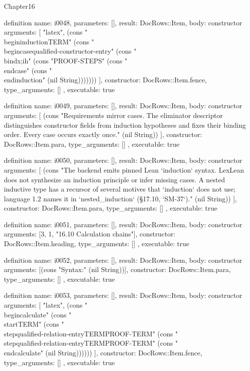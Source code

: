 \begin{lexlean}{Chapter16}
\begin{semanticmodule}
definition{
  name: i0048,
  parameters: [],
  result: DocRows::Item,
  body: constructor{
    arguments: [
      "latex",
      (cons "\\begin{induction}{TERM}" (cons "\\begin{case}{qualified-constructor-entry}" (cons "\\bind{x;ih}" (cons "PROOF-STEPS" (cons "\\end{case}" (cons "\\end{induction}" (nil String)))))))
    ],
    constructor: DocRows::Item.fence,
    type_arguments: []
  },
  executable: true
}

definition{
  name: i0049,
  parameters: [],
  result: DocRows::Item,
  body: constructor{
    arguments: [
      (cons "Requirements mirror cases. The eliminator descriptor distinguishes constructor fields from induction hypotheses and fixes their binding order. Every case occurs exactly once." (nil String))
    ],
    constructor: DocRows::Item.para,
    type_arguments: []
  },
  executable: true
}

definition{
  name: i0050,
  parameters: [],
  result: DocRows::Item,
  body: constructor{
    arguments: [
      (cons "The backend emits pinned Lean `induction` syntax. LexLean does not synthesize an induction principle or infer missing cases. A nested inductive type has a recursor of several motives that `induction` does not use; language 1.2 names it in `nested_induction` (§17.10, `SM-37`)." (nil String))
    ],
    constructor: DocRows::Item.para,
    type_arguments: []
  },
  executable: true
}

definition{
  name: i0051,
  parameters: [],
  result: DocRows::Item,
  body: constructor{
    arguments: [3, 1, "16.10 Calculation chains"],
    constructor: DocRows::Item.heading,
    type_arguments: []
  },
  executable: true
}

definition{
  name: i0052,
  parameters: [],
  result: DocRows::Item,
  body: constructor{
    arguments: [(cons "Syntax:" (nil String))],
    constructor: DocRows::Item.para,
    type_arguments: []
  },
  executable: true
}

definition{
  name: i0053,
  parameters: [],
  result: DocRows::Item,
  body: constructor{
    arguments: [
      "latex",
      (cons "\\begin{calculate}" (cons "\\start{TERM}" (cons "\\step{qualified-relation-entry}{TERM}{PROOF-TERM}" (cons "\\step{qualified-relation-entry}{TERM}{PROOF-TERM}" (cons "\\end{calculate}" (nil String))))))
    ],
    constructor: DocRows::Item.fence,
    type_arguments: []
  },
  executable: true
}


\end{semanticmodule}
\end{lexlean}

